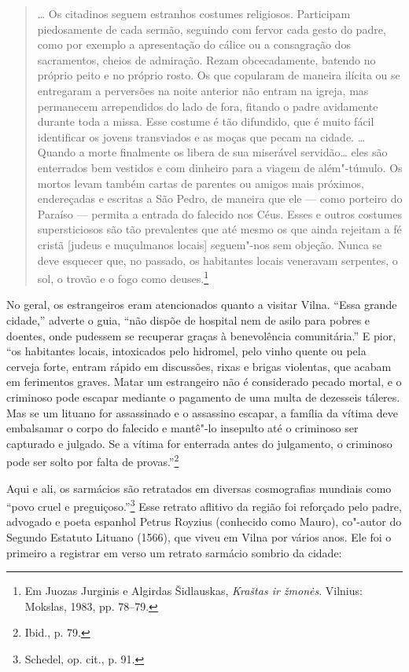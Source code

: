\begin{quote}
\ldots{} Os citadinos seguem estranhos costumes religiosos. Participam
piedosamente de cada sermão, seguindo com fervor cada gesto do padre,
como por exemplo a apresentação do cálice ou a consagração dos
sacramentos, cheios de admiração. Rezam obcecadamente, batendo no
próprio peito e no próprio rosto. Os que copularam de maneira ilícita ou
se entregaram a perversões na noite anterior não entram na igreja, mas
permanecem arrependidos do lado de fora, fitando o padre avidamente
durante toda a missa. Esse costume é tão difundido, que é muito fácil
identificar os jovens transviados e as moças que pecam na cidade.
\ldots{} Quando a morte finalmente os libera de sua miserável
servidão\ldots{} eles são enterrados bem vestidos e com dinheiro para a
viagem de além"-túmulo. Os mortos levam também cartas de parentes ou
amigos mais próximos, endereçadas e escritas a São Pedro, de maneira que
ele --- como porteiro do Paraíso --- permita a entrada do falecido nos Céus.
Esses e outros costumes supersticiosos são tão prevalentes que até mesmo
os que ainda rejeitam a fé cristã {[}judeus e muçulmanos locais{]}
seguem"-nos sem objeção. Nunca se deve esquecer que, no passado, os
habitantes locais veneravam serpentes, o sol, o trovão e o fogo como
deuses.\footnote{Em Juozas Jurginis e Algirdas Šidlauskas, \emph{Kraštas
  ir žmonės}. Vilnius: Mokslas, 1983, pp. 78--79.}
  \end{quote}

\asterisc

No geral, os estrangeiros eram atencionados quanto a visitar Vilna.
``Essa grande cidade,'' adverte o guia, ``não dispõe de hospital nem de
asilo para pobres e doentes, onde pudessem se recuperar graças à
benevolência comunitária.'' E pior, ``os habitantes locais, intoxicados
pelo hidromel, pelo vinho quente ou pela cerveja forte, entram rápido em
discussões, rixas e brigas violentas, que acabam em ferimentos graves.
Matar um estrangeiro não é considerado pecado mortal, e o criminoso pode
escapar mediante o pagamento de uma multa de dezesseis táleres. Mas se
um lituano for assassinado e o assassino escapar, a família da vítima
deve embalsamar o corpo do falecido e mantê"-lo insepulto até o criminoso
ser capturado e julgado. Se a vítima for enterrada antes do julgamento,
o criminoso pode ser solto por falta de provas.''\footnote{Ibid., p. 79.}

Aqui e ali, os sarmácios são retratados em diversas cosmografias
mundiais como ``povo cruel e preguiçoso.''\footnote{Schedel, op. cit.,
  p. 91.} Esse retrato aflitivo da região foi reforçado pelo padre,
advogado e poeta espanhol Petrus Royzius (conhecido como Mauro),
co"-autor do Segundo Estatuto Lituano (1566), que viveu em Vilna por
vários anos. Ele foi o primeiro a registrar em verso um retrato sarmácio
sombrio da cidade:

